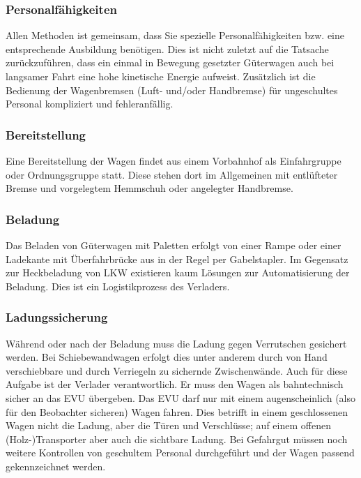 \subsubsection{Personalfähigkeiten}\label{sec:Personal}
Allen Methoden ist gemeinsam, dass Sie spezielle Personalfähigkeiten bzw. eine entsprechende Ausbildung benötigen. Dies ist nicht zuletzt auf die Tatsache zurückzuführen, dass ein einmal in Bewegung gesetzter Güterwagen auch bei langsamer Fahrt eine hohe kinetische Energie aufweist. Zusätzlich ist die Bedienung der Wagenbremsen (Luft- und/oder Handbremse) für ungeschultes Personal kompliziert und fehleranfällig.
\subsubsection{Bereitstellung}
Eine Bereitstellung der Wagen findet aus einem \gls{Vorbahnhof} als Einfahrgruppe oder Ordnungsgruppe statt. Diese stehen dort im Allgemeinen mit entlüfteter Bremse und vorgelegtem Hemmschuh oder angelegter Handbremse.
\subsubsection{Beladung}
Das Beladen von Güterwagen mit Paletten erfolgt von einer Rampe oder einer Ladekante mit Überfahrbrücke aus in der Regel per Gabelstapler. Im Gegensatz zur Heckbeladung von LKW existieren kaum Lösungen zur Automatisierung der Beladung. Dies ist ein Logistikprozess des Verladers.
\subsubsection{Ladungssicherung}
Während oder nach der Beladung muss die Ladung gegen Verrutschen gesichert werden. Bei Schiebewandwagen erfolgt dies unter anderem durch von Hand verschiebbare und durch Verriegeln zu sichernde Zwischenwände. Auch für diese Aufgabe ist der Verlader verantwortlich. Er muss den Wagen als bahntechnisch sicher an das EVU übergeben. Das EVU darf nur mit einem augenscheinlich (also für den Beobachter sicheren) Wagen fahren. Dies betrifft in einem geschlossenen Wagen nicht die Ladung, aber die Türen und Verschlüsse; auf einem offenen (Holz-)Transporter aber auch die sichtbare Ladung. Bei Gefahrgut müssen noch weitere Kontrollen von geschultem Personal durchgeführt und der Wagen passend gekennzeichnet werden.
